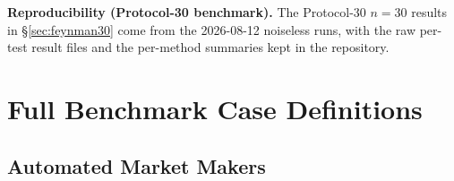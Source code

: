 \documentclass[twoside,11pt]{article}
\begin{document}
\textbf{Reproducibility (Protocol-30 benchmark).} The Protocol-30 $n=30$ results in
\S\ref{sec:feynman30} come from the 2026-08-12 noiseless runs, with the raw
per-test result files and the per-method summaries kept in the repository.




\appendix

\section{Full Benchmark Case Definitions}\label{sec:benchmark_cases}
\label{app:cases}

\subsection{Automated Market Makers}\label{subsec:automated-market-makers}
\label{sec:bench_amm}
\end{document}
